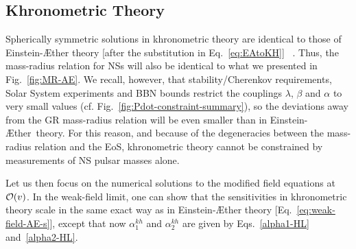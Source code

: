 \documentclass[prd,aps,twocolumn,nofootinbib,showpacs,superscriptaddress]{revtex4-1}
\def\kh{{kh}}
\begin{document}
\subsection{Khronometric Theory}

Spherically symmetric solutions in khronometric theory are identical
to those of Einstein-\AE ther theory [after the substitution in Eq.~\eqref{eq:EAtoKH}]~\cite{Jacobson:2010mx,Blas:2011ni,Blas:2010hb,Barausse:2012ny} . Thus, the mass-radius relation for NSs
will also be identical to what we presented in Fig.~\ref{fig:MR-AE}. 
We recall, however, that stability/Cherenkov requirements, Solar System experiments and BBN bounds 
restrict the couplings $\lambda$, $\beta$ and $\alpha$ to very small values (cf. Fig.~\ref{fig:Pdot-constraint-summary}),
so the deviations away from the GR mass-radius relation will be even smaller than in Einstein-\AE ther~theory.
For this reason, and because of the degeneracies between the mass-radius relation and the EoS,
khronometric theory cannot
be constrained by measurements of NS pulsar masses alone.

Let us then focus on the numerical solutions to the modified field equations 
at ${\cal{O}}(v)$. In the weak-field limit, one can show
that the sensitivities in khronometric theory scale in the same exact way as
in Einstein-\AE ther theory [Eq.~\eqref{eq:weak-field-AE-s}], except that now $\alpha_{1}^{\kh}$ and
$\alpha_{2}^{\kh}$ are given by Eqs.~\eqref{alpha1-HL} and~\eqref{alpha2-HL}. 
\end{document}
